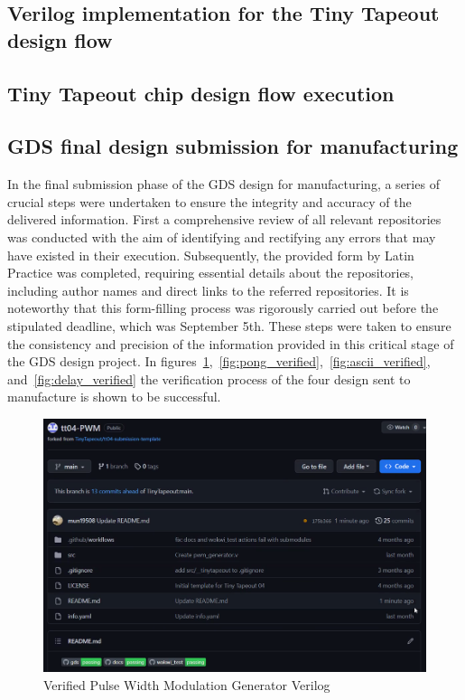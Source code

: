 \subsection{Verilog implementation for the Tiny Tapeout design flow}

\subsection{Tiny Tapeout chip design flow execution}

\subsection{GDS final design submission for manufacturing}
In the final submission phase of the GDS design for manufacturing, a series of crucial steps were undertaken to ensure the integrity and accuracy of the delivered information. First a comprehensive review of all relevant repositories was conducted with the aim of identifying and rectifying any errors that may have existed in their execution. Subsequently, the provided form by Latin Practice was completed, requiring essential details about the repositories, including author names and direct links to the referred repositories. It is noteworthy that this form-filling process was rigorously carried out before the stipulated deadline, which was September 5th. These steps were taken to ensure the consistency and precision of the information provided in this critical stage of the GDS design project. In figures\ \ref*{fig:pwm_verified},\ \ref*{fig:pong_verified},\ \ref*{fig:ascii_verified}, and\ \ref*{fig:delay_verified} the verification process of the four design sent to manufacture is shown to be successful.

\begin{figure}[H]
    \centering
    \includegraphics[width=\linewidth]{Pictures/pwm_verified.png}
    \caption{Verified Pulse Width Modulation Generator Verilog }\label{fig:pwm_verified}
\end{figure}

